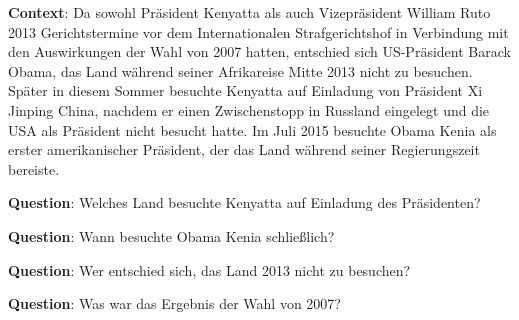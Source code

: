 \begin{examples}
  \item \label{itm:xquad} \textbf{Context}: Da sowohl Präsident Kenyatta als auch Vizepräsident William Ruto
        2013 Gerichtstermine vor dem Internationalen Strafgerichtshof in Verbindung mit den
        Auswirkungen der Wahl von 2007 hatten, entschied sich US-Präsident Barack Obama,
        das Land während seiner Afrikareise Mitte 2013 nicht zu besuchen. Später in diesem
        Sommer besuchte Kenyatta auf Einladung von Präsident Xi Jinping China, nachdem er
        einen Zwischenstopp in Russland eingelegt und die USA als Präsident nicht besucht
        hatte. Im Juli 2015 besuchte Obama Kenia als erster amerikanischer Präsident, der
        das Land während seiner Regierungszeit bereiste.

        \textbf{Question}: Welches Land besuchte Kenyatta auf Einladung des Präsidenten?

        \textbf{Question}: Wann besuchte Obama Kenia schließlich?

        \textbf{Question}: Wer entschied sich, das Land 2013 nicht zu besuchen?

        \textbf{Question}: Was war das Ergebnis der Wahl von 2007?
\end{examples}





